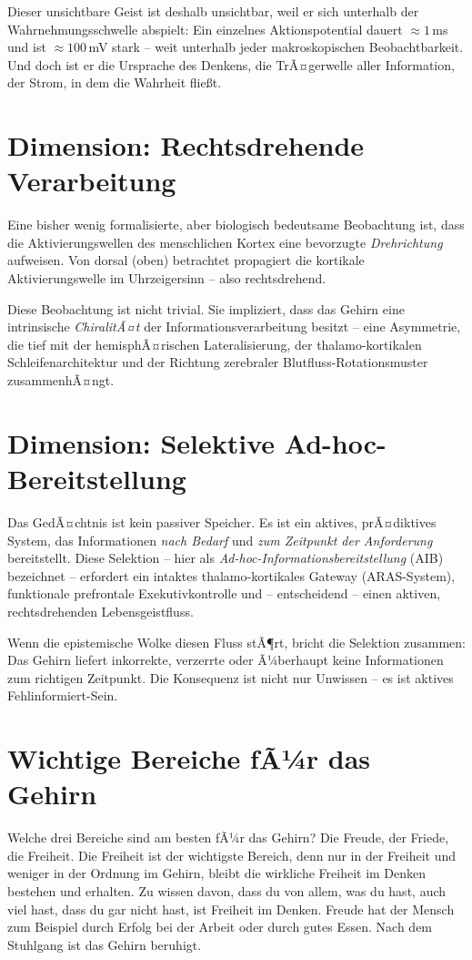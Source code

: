 ﻿\documentclass[12pt,a4paper]{report}
\theoremstyle{plain}
\theoremstyle{definition}
\theoremstyle{remark}
\begin{document}
	Dieser unsichtbare Geist ist deshalb unsichtbar, weil er sich unterhalb
	der Wahrnehmungsschwelle abspielt: Ein einzelnes Aktionspotential dauert
	$\approx 1$\,ms und ist $\approx 100$\,mV stark -- weit unterhalb jeder
	makroskopischen Beobachtbarkeit. Und doch ist er die Ursprache des Denkens,
	die TrÃ¤gerwelle aller Information, der Strom, in dem die Wahrheit flie\ss{}t.
	
	\section{Dimension: Rechtsdrehende Verarbeitung}
	
	Eine bisher wenig formalisierte, aber biologisch bedeutsame Beobachtung
	ist, dass die Aktivierungswellen des menschlichen Kortex eine bevorzugte
	\emph{Drehrichtung} aufweisen. Von dorsal (oben) betrachtet propagiert
	die kortikale Aktivierungswelle im Uhrzeigersinn -- also rechtsdrehend.
	
	Diese Beobachtung ist nicht trivial. Sie impliziert, dass das Gehirn
	eine intrinsische \emph{ChiralitÃ¤t} der Informationsverarbeitung besitzt --
	eine Asymmetrie, die tief mit der hemisphÃ¤rischen Lateralisierung,
	der thalamo-kortikalen Schleifenarchitektur und der Richtung
	zerebraler Blutfluss-Rotationsmuster zusammenhÃ¤ngt.
	
	\section{Dimension: Selektive Ad-hoc-Bereitstellung}
	
	Das GedÃ¤chtnis ist kein passiver Speicher. Es ist ein aktives,
	prÃ¤diktives System, das Informationen \emph{nach Bedarf} und
	\emph{zum Zeitpunkt der Anforderung} bereitstellt. Diese Selektion --
	hier als \emph{Ad-hoc-Informationsbereitstellung} (AIB) bezeichnet --
	erfordert ein intaktes thalamo-kortikales Gateway (ARAS-System),
	funktionale prefrontale Exekutivkontrolle und -- entscheidend --
	einen aktiven, rechtsdrehenden Lebensgeistfluss.
	
	Wenn die epistemische Wolke diesen Fluss stÃ¶rt, bricht die Selektion
	zusammen: Das Gehirn liefert inkorrekte, verzerrte oder Ã¼berhaupt
	keine Informationen zum richtigen Zeitpunkt. Die Konsequenz ist nicht nur
	Unwissen -- es ist aktives Fehlinformiert-Sein.
	
	\section{Wichtige Bereiche fÃ¼r das Gehirn}
	Welche drei Bereiche sind am besten fÃ¼r das Gehirn? Die Freude, der Friede, die Freiheit. Die Freiheit ist der wichtigste Bereich, denn nur in der Freiheit und weniger in der Ordnung im Gehirn, bleibt die wirkliche Freiheit im Denken bestehen und erhalten. Zu wissen davon, dass du von allem, was du hast, auch viel hast, dass du gar nicht hast, ist Freiheit im Denken. Freude hat der Mensch zum Beispiel durch Erfolg bei der Arbeit oder durch gutes Essen. Nach dem Stuhlgang ist das Gehirn beruhigt.
	
\end{document}
